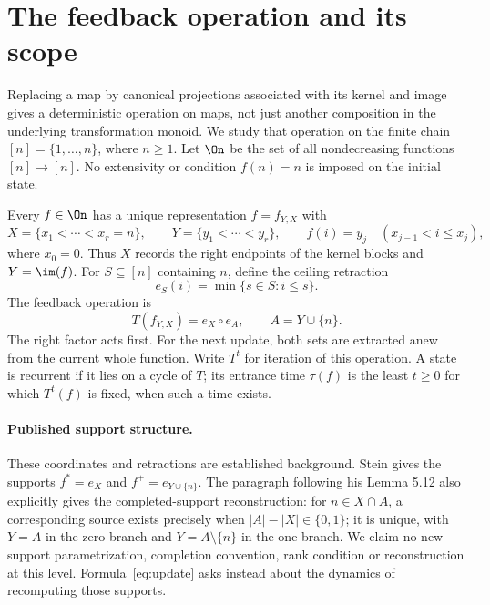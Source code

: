 \section{The feedback operation and its scope}

Replacing a map by canonical projections associated with its kernel and
image gives a deterministic operation on maps, not just another
composition in the underlying transformation monoid. We study that
operation on the finite chain $[n]=\{1,\ldots,n\}$, where $n\ge1$.
Let $\On$ be the set of all nondecreasing functions $[n]\to[n]$.
No extensivity or condition $f(n)=n$ is imposed on the initial state.

Every $f\in\On$ has a unique representation $f=f_{Y,X}$ with
\[
 X=\{x_1<\cdots<x_r=n\},\qquad
 Y=\{y_1<\cdots<y_r\},\qquad
 f(i)=y_j\quad(x_{j-1}<i\le x_j),
\]
where $x_0=0$. Thus $X$ records the right endpoints of the kernel blocks
and $Y=\im(f)$. For $S\subseteq[n]$ containing $n$, define the ceiling
retraction
\begin{equation}\label{eq:ceiling}
 e_S(i)=\min\{s\in S:i\le s\}.
\end{equation}
The feedback operation is
\begin{equation}\label{eq:update}
 T(f_{Y,X})=e_X\circ e_A,\qquad A=Y\cup\{n\}.
\end{equation}
The right factor acts first. For the next update, both sets are extracted
anew from the current whole function. Write $T^t$ for iteration of this
operation. A state is recurrent if it lies on a cycle of $T$; its entrance
time $\tau(f)$ is the least $t\ge0$ for which $T^t(f)$ is fixed, when
such a time exists.

\paragraph{Published support structure.}
These coordinates and retractions are established background. Stein
\cite[Section 5.1]{stein2025order} gives the supports
$f^*=e_X$ and $f^+=e_{Y\cup\{n\}}$. The paragraph following his
Lemma 5.12 also explicitly gives the completed-support reconstruction:
for $n\in X\cap A$, a corresponding source exists precisely when
$|A|-|X|\in\{0,1\}$; it is unique, with $Y=A$ in the zero branch and
$Y=A\setminus\{n\}$ in the one branch. We claim no new support
parametrization, completion convention, rank condition or reconstruction
at this level. Formula~\eqref{eq:update} asks instead about the dynamics
of recomputing those supports.

